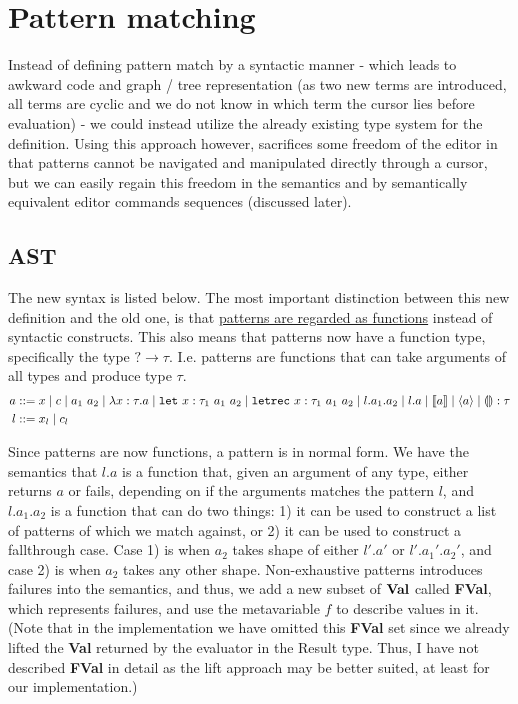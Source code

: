 \documentclass[10pt,a4paper,english]{article}
\newcommand\letin[3]{\texttt{let}~#1~#2~#3}
\newcommand\letrec[3]{\texttt{letrec}~#1~#2~#3}
\begin{document}
\newpage

\section{Pattern matching}
Instead of defining pattern match by a syntactic manner - which leads to awkward code and graph / tree representation (as two new terms are introduced, all terms are cyclic and we do not know in which term the cursor lies before evaluation) - we could instead utilize the already existing type system for the definition. Using this approach however, sacrifices some freedom of the editor in that patterns cannot be navigated and manipulated directly through a cursor, but we can easily regain this freedom in the semantics and by semantically equivalent editor commands sequences (discussed later).

\subsection{AST}
The new syntax is listed below. The most important distinction between this new definition and the old one, is that \underline{patterns are regarded as functions} instead of syntactic constructs. This also means that patterns now have a function type, specifically the type $\texttt{?}\to\tau$. I.e. patterns are functions that can take arguments of all types and produce type $\tau$.
\begin{align}
  a &::= x
  \mid c
  \mid \app{a_1}{a_2}
  \mid \abs{\bind{x}{\tau}}{a}
  \mid \letin{\bind{x}{\tau_1}}{a_1}{a_2}
  \mid \letrec{\bind{x}{\tau_1}}{a_1}{a_2}
  \mid l.a_1.a_2
  \mid l.a
  \mid \cursor{a}
  \mid \breakpoint{a}
  \mid \bind{\hole}{\tau}\\
  l &::= x_l
  \mid c_l
\end{align}

Since patterns are now functions, a pattern is in normal form. We have the semantics that $l.a$ is a function that, given an argument of any type, either returns $a$ or fails, depending on if the arguments matches the pattern $l$, and $l.a_1.a_2$ is a function that can do two things: 1) it can be used to construct a list of patterns of which we match against, or 2) it can be used to construct a fallthrough case. Case 1) is when $a_2$ takes shape  of either $l'.a'$ or $l'.a_1'.a_2'$, and case 2) is when $a_2$ takes any other shape. Non-exhaustive patterns introduces failures into the semantics, and thus, we add a new subset of $\textbf{Val}$ called \textbf{FVal}, which represents failures, and use the metavariable $f$ to describe values in it. (Note that in the implementation we have omitted this \textbf{FVal} set since we already lifted the \textbf{Val} returned by the evaluator in the Result type. Thus, I have not described \textbf{FVal} in detail as the lift approach may be better suited, at least for our implementation.)
\end{document}
